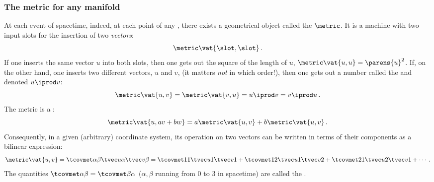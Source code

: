 \subsubsection{The metric for any manifold}
%
At each event of spacetime, indeed, at each point of any , there exists a geometrical object called the  $\metric$. It is a machine with two input slots for the insertion of two \emph{vectors}:
%
\begin{equation*}
  \metric\vat{\slot, \slot}\,.
\end{equation*}
%
If one inserts the same vector $u$ into both slots, then one gets out the square of the length of $u$, $\metric\vat{u,u} = \parens{u}^2$. If, on the other hand, one inserts two different vectors, $u$ and $v$, (it matters \emph{not} in which order!), then one gets out a number called the  and denoted $u\iprod v$:
%
\begin{equation*}
  \metric\vat{u,v} = \metric\vat{v,u}
                   = u\iprod v
                   = v\iprod u\,.
\end{equation*}
%
The metric is a :
%
\begin{equation*}
  \metric\vat{u, av + bw} = a\metric\vat{u, v} + b\metric\vat{u, v}\,.
\end{equation*}
%
Consequently, in a given (arbitrary) coordinate system, its operation on two vectors can be written in terms of their components as a bilinear expression:
%
\begin{equation*}
  \metric\vat{u,v} = \tcovmet\alpha\beta\tvec u\alpha\tvec v\beta
                   = \tcovmet 11\tvec u1\tvec v1 + \tcovmet 12\tvec u1\tvec v2 + \tcovmet 21\tvec u2\tvec v1 + \dotsb\,.
\end{equation*}
%
The quantities $\tcovmet\alpha\beta = \tcovmet\beta\alpha$ ($\alpha,\beta$ running from 0 to 3 in spacetime) are called the .


